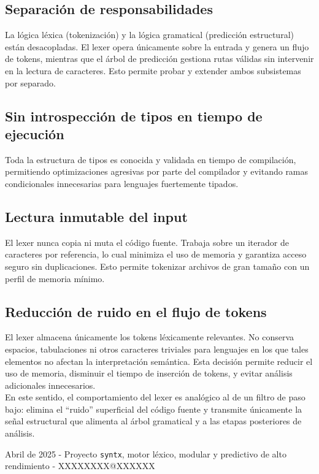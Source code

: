 \documentclass{article}
\begin{document}
\subsection*{Separación de responsabilidades}

La lógica léxica (tokenización) y la lógica gramatical (predicción estructural) están desacopladas. El lexer opera únicamente sobre la entrada y genera un flujo de tokens, mientras que el árbol de predicción gestiona rutas válidas sin intervenir en la lectura de caracteres. Esto permite probar y extender ambos subsistemas por separado.

\subsection*{Sin introspección de tipos en tiempo de ejecución}

Toda la estructura de tipos es conocida y validada en tiempo de compilación, permitiendo optimizaciones agresivas por parte del compilador y evitando ramas condicionales innecesarias para lenguajes fuertemente tipados.

\subsection*{Lectura inmutable del input}

El lexer nunca copia ni muta el código fuente. Trabaja sobre un iterador de caracteres por referencia, lo cual minimiza el uso de memoria y garantiza acceso seguro sin duplicaciones. Esto permite tokenizar archivos de gran tamaño con un perfil de memoria mínimo.

\subsection*{Reducción de ruido en el flujo de tokens}

El lexer almacena únicamente los tokens léxicamente relevantes. No conserva espacios, tabulaciones ni otros caracteres triviales para lenguajes en los que tales elementos no afectan la interpretación semántica. Esta decisión permite reducir el uso de memoria, disminuir el tiempo de inserción de tokens, y evitar análisis adicionales innecesarios.
\\
En este sentido, el comportamiento del lexer es analógico al de un filtro de paso bajo: elimina el “ruido” superficial del código fuente y transmite únicamente la señal estructural que alimenta al árbol gramatical y a las etapas posteriores de análisis.
\vfill
\begin{center}
\small Abril de 2025 - Proyecto \texttt{syntx}, motor léxico, modular y predictivo de alto rendimiento - XXXXXXXX@XXXXXX
\end{center}
\end{document}
